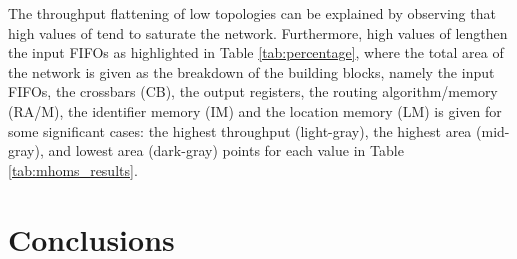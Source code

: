 \documentclass[10pt,twocolumn,journal]{IEEEtran}
\begin{document}
The throughput flattening of low  topologies can be explained by observing that high 
values of  
tend to saturate the network. Furthermore, high values of  lengthen the input FIFOs as highlighted in Table 
\ref{tab:percentage}, where the total area of the network is given as the breakdown of the building blocks, 
namely the input FIFOs, the crossbars (CB), the output registers, the routing algorithm/memory (RA/M), the identifier 
memory (IM) and the location memory (LM) is given for some significant cases: 
the highest throughput (light-gray),
the highest area (mid-gray), and lowest area (dark-gray) points for each  value in Table \ref{tab:mhoms_results}. 



\section{Conclusions}
\label{sec:concl}
\end{document}

